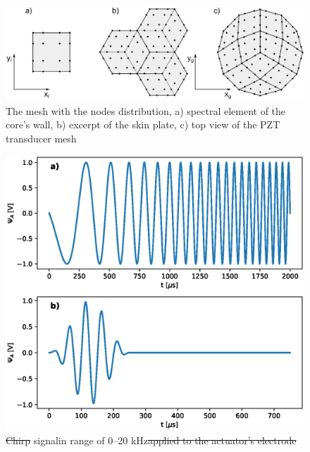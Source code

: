\documentclass[materials,article,submit,moreauthors,pdftex]{Definitions/mdpi}
\providecommand{\DIFadd}[1]{{\protect\color{blue}{#1}}} %
\providecommand{\DIFdel}[1]{{\protect\color{red}\sout{#1}}}                      %
\providecommand{\DIFaddbegin}{} %
\providecommand{\DIFaddend}{} %
\providecommand{\DIFaddFL}[1]{\DIFadd{#1}} %
\providecommand{\DIFdelFL}[1]{\DIFdel{#1}} %
\providecommand{\DIFaddbeginFL}{} %
\providecommand{\DIFaddendFL}{} %
\providecommand{\DIFdelbeginFL}{} %
\providecommand{\DIFdelendFL}{} %
\begin{document}
\DIFaddend \begin{figure}
	\begin{center}
		\includegraphics[width=1\linewidth]{../../figures/eps/skin_mesh.eps}
	\end{center}
	\caption{The mesh with the nodes distribution, a) spectral element of the core's wall, b) excerpt of the skin plate, c) top view of the PZT transducer mesh}
	\label{fig:skin_mesh}
\end{figure}
\begin{figure}
	\begin{center}
		\DIFdelbeginFL %
\DIFdelendFL \DIFaddbeginFL \includegraphics[width=1\linewidth]{../../figures/eps/signal.eps}
	\DIFaddendFL \end{center}
	\caption{\DIFdelbeginFL \DIFdelFL{Chirp }\DIFdelendFL \DIFaddbeginFL \DIFaddFL{Excitation }\DIFaddendFL signal\DIFaddbeginFL \DIFaddFL{, a) chirp }\DIFaddendFL in \DIFaddbeginFL \DIFaddFL{a }\DIFaddendFL range of 0--20 kHz\DIFdelbeginFL \DIFdelFL{applied to the actuator's electrode}\DIFdelendFL \DIFaddbeginFL \DIFaddFL{, b) ten-cycle sine pulse with central frequency 20 kHz}\DIFaddendFL }
	\DIFdelbeginFL %
\DIFdelendFL \DIFaddbeginFL \label{fig:signal}
\DIFaddendFL \end{figure}
\DIFaddbegin 
\end{document}
